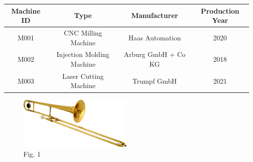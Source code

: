 \documentclass{article}
\begin{document}
\begin{tabular}{|c|c|c|c|}
\hline
Machine ID & Type & Manufacturer & Production Year \\
\hline
M001 & CNC Milling Machine & Haas Automation & 2020 \\
\hline
M002 & Injection Molding Machine & Arburg GmbH + Co KG & 2018 \\
\hline
M003 & Laser Cutting Machine & Trumpf GmbH & 2021 \\
\hline
\end{tabular}
\begin{figure}[h!]
\centering
\includegraphics[width=0.5\textwidth]{img.png}
\caption{Fig. 1}
\end{figure}
\end{document}
